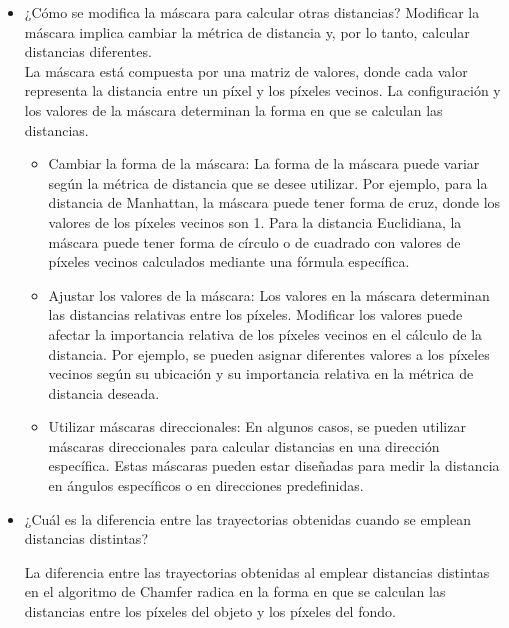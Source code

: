 \documentclass{article}
\begin{document}
\begin{itemize}
\item ¿Cómo se modifica la máscara para calcular otras distancias?
  Modificar la máscara implica cambiar la métrica de distancia y, por lo tanto, calcular distancias diferentes.\\

  La máscara está compuesta por una matriz de valores, donde cada valor representa la distancia entre un píxel y los píxeles vecinos. La configuración y los valores de la máscara determinan la forma en que se calculan las distancias.\\

  \begin{itemize}
  \item Cambiar la forma de la máscara: La forma de la máscara puede variar según la métrica de distancia que se desee utilizar. Por ejemplo, para la distancia de Manhattan, la máscara puede tener forma de cruz, donde los valores de los píxeles vecinos son 1. Para la distancia Euclidiana, la máscara puede tener forma de círculo o de cuadrado con valores de píxeles vecinos calculados mediante una fórmula específica.
  \item Ajustar los valores de la máscara: Los valores en la máscara determinan las distancias relativas entre los píxeles. Modificar los valores puede afectar la importancia relativa de los píxeles vecinos en el cálculo de la distancia. Por ejemplo, se pueden asignar diferentes valores a los píxeles vecinos según su ubicación y su importancia relativa en la métrica de distancia deseada.
  \item Utilizar máscaras direccionales: En algunos casos, se pueden utilizar máscaras direccionales para calcular distancias en una dirección específica. Estas máscaras pueden estar diseñadas para medir la distancia en ángulos específicos o en direcciones predefinidas.
  \end{itemize}
  
\item ¿Cuál es la diferencia entre las trayectorias obtenidas cuando se emplean distancias distintas?

  La diferencia entre las trayectorias obtenidas al emplear distancias distintas en el algoritmo de Chamfer radica en la forma en que se calculan las distancias entre los píxeles del objeto y los píxeles del fondo.


\end{itemize}
\end{document}
